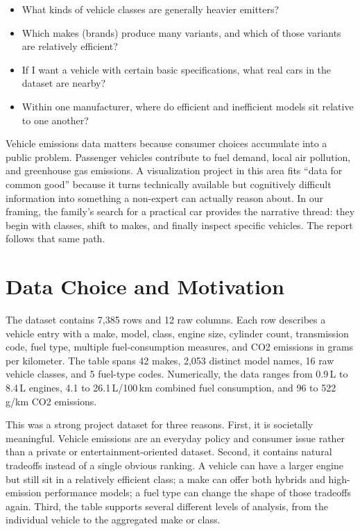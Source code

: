 \documentclass[12pt,letterpaper]{article}
\begin{document}
\begin{itemize}
\item What kinds of vehicle classes are generally heavier emitters?
\item Which makes (brands) produce many variants, and which of those variants are relatively efficient?
\item If I want a vehicle with certain basic specifications, what real cars in the dataset are nearby?
\item Within one manufacturer, where do efficient and inefficient models sit relative to one another?
\end{itemize}

Vehicle emissions data matters because consumer choices accumulate into a public problem. Passenger vehicles contribute to fuel demand, local air pollution, and greenhouse gas emissions. A visualization project in this area fits ``data for common good'' because it turns technically available but cognitively difficult information into something a non-expert can actually reason about. In our framing, the family's search for a practical car provides the narrative thread: they begin with classes, shift to makes, and finally inspect specific vehicles. The report follows that same path.

\section{Data Choice and Motivation}
The dataset contains 7,385 rows and 12 raw columns. Each row describes a vehicle entry with a make, model, class, engine size, cylinder count, transmission code, fuel type, multiple fuel-consumption measures, and CO2 emissions in grams per kilometer. The table spans 42 makes, 2,053 distinct model names, 16 raw vehicle classes, and 5 fuel-type codes. Numerically, the data ranges from 0.9\,L to 8.4\,L engines, 4.1 to 26.1\,L/100\,km combined fuel consumption, and 96 to 522\,g/km CO2 emissions.

This was a strong project dataset for three reasons. First, it is societally meaningful. Vehicle emissions are an everyday policy and consumer issue rather than a private or entertainment-oriented dataset. Second, it contains natural tradeoffs instead of a single obvious ranking. A vehicle can have a larger engine but still sit in a relatively efficient class; a make can offer both hybrids and high-emission performance models; a fuel type can change the shape of those tradeoffs again. Third, the table supports several different levels of analysis, from the individual vehicle to the aggregated make or class.
\end{document}
